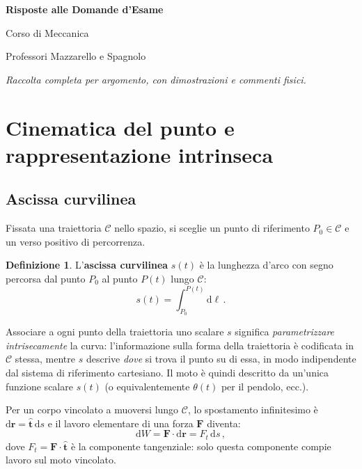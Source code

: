 \documentclass[11pt,a4paper]{article}
\renewcommand{\vec}[1]{\bm{#1}}
\newcommand{\vt}{\hat{\bm{t}}}
\theoremstyle{plain}
\theoremstyle{definition}
\newtheorem{definizione}{Definizione}[section]
\theoremstyle{remark}
\begin{document}
\begin{titlepage}
  \centering\vspace*{2.5cm}
  {\LARGE\bfseries Risposte alle Domande d'Esame\par}\vspace{0.6cm}
  {\Large Corso di Meccanica\par}\vspace{0.3cm}
  {\large Professori Mazzarello e Spagnolo\par}\vfill
  {\itshape Raccolta completa per argomento, con dimostrazioni e commenti fisici.}\vspace{1.2cm}
\end{titlepage}

\tableofcontents\newpage

\section{Cinematica del punto e rappresentazione intrinseca}

\subsection{Ascissa curvilinea}

Fissata una traiettoria $\mathcal{C}$ nello spazio, si sceglie un punto di
riferimento $P_0\in\mathcal{C}$ e un verso positivo di percorrenza.
\begin{definizione}
L'\textbf{ascissa curvilinea} $s(t)$ è la lunghezza d'arco con segno percorsa
dal punto $P_0$ al punto $P(t)$ lungo $\mathcal{C}$:
\[
  s(t)=\int_{P_0}^{P(t)}\mathrm{d}\ell\,.
\]
\end{definizione}
Associare a ogni punto della traiettoria uno scalare $s$ significa
\emph{parametrizzare intrisecamente} la curva: l'informazione sulla forma della
traiettoria è codificata in $\mathcal{C}$ stessa, mentre $s$ descrive
\emph{dove} si trova il punto su di essa, in modo indipendente dal sistema di
riferimento cartesiano. Il moto è quindi descritto da un'unica funzione
scalare $s(t)$ (o equivalentemente $\theta(t)$ per il pendolo, ecc.).

Per un corpo vincolato a muoversi lungo $\mathcal{C}$, lo spostamento
infinitesimo è $\mathrm{d}\vec{r}=\vt\,\mathrm{d}s$ e il lavoro elementare di
una forza $\vec{F}$ diventa:
\[
  \mathrm{d}W = \vec{F}\cdot\mathrm{d}\vec{r} = F_t\,\mathrm{d}s\,,
\]
dove $F_t=\vec{F}\cdot\vt$ è la componente tangenziale: solo questa componente
compie lavoro sul moto vincolato.
\end{document}
